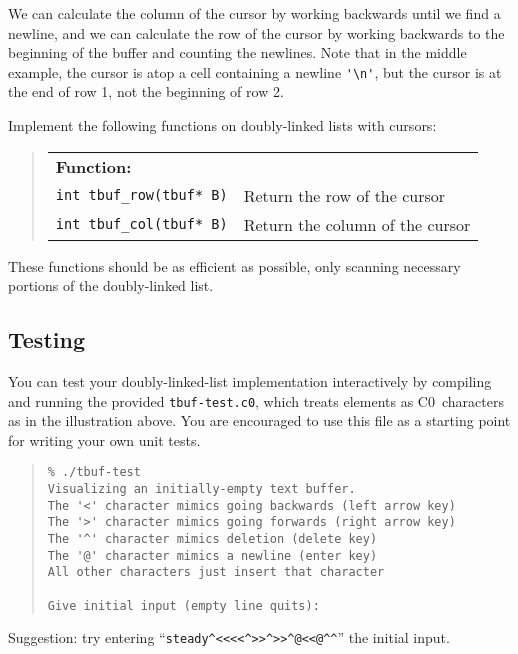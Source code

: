\documentclass[12pt]{exam}
\begin{document}
We can calculate the column of the cursor by working backwards until
we find a newline, and we can calculate the row of the cursor by
working backwards to the beginning of the buffer and counting the
newlines. Note that in the middle example, the cursor is atop a cell
containing a newline \lstinline"'\n'", but the cursor is at the end of
row 1, not the beginning of row 2.

\begin{task}[2]
Implement the following functions on doubly-linked lists with cursors:

\begin{quote}
\begin{tabular}{p{}p{}}
    \textbf{Function:}             & \textbf{} \\
    \lstinline"int tbuf_row(tbuf* B)"
      & Return the row of the cursor \\
    \lstinline"int tbuf_col(tbuf* B)"
      & Return the column of the cursor \\
\end{tabular}
\end{quote}
\end{task}

\noindent
These functions should be as efficient as possible, only scanning necessary
portions of the doubly-linked list.


\subsection{Testing}

You can test your doubly-linked-list implementation interactively by
compiling and running the provided \lstinline'tbuf-test.c0', which
treats elements as C0~characters as in the illustration
above. You are encouraged to use this file as a starting point for
writing your own unit tests.
\begin{quote}
\begin{lstlisting}[language={[coin]C}]
% cc0 -d -w -o tbuf-test tbuf.c0 tbuf-test.c0 test-main.c0
% ./tbuf-test
Visualizing an initially-empty text buffer.
The '<' character mimics going backwards (left arrow key)
The '>' character mimics going forwards (right arrow key)
The '^' character mimics deletion (delete key)
The '@' character mimics a newline (enter key)
All other characters just insert that character

Give initial input (empty line quits):
\end{lstlisting}
\end{quote}
Suggestion: try entering ``\lstinline'steady^<<<<^>>^>>^@<<@^^'''
the initial input.
\end{document}
